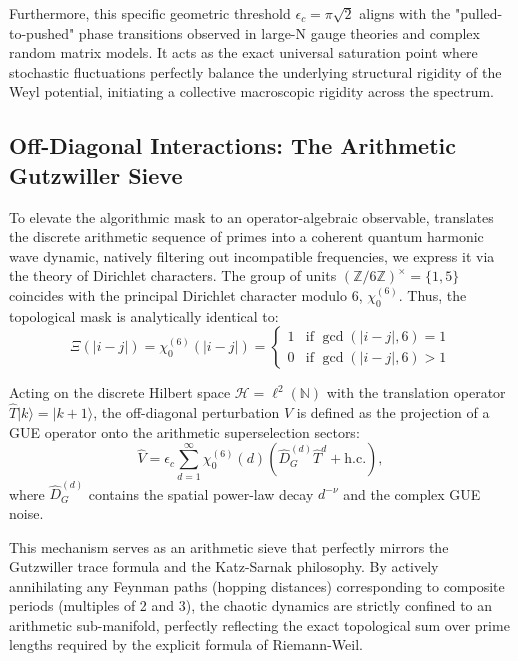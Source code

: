 \documentclass[aps,prl,preprint,superscriptaddress,floatfix]{revtex4-2}
\newcommand{\N}{\mathbb{N}}
\newcommand{\Hilb}{\mathcal{H}}
\newcommand{\Zmod}{\mathbb{Z}/6\mathbb{Z}}
\begin{document}
Furthermore, this specific geometric threshold $\epsilon_c = \pi\sqrt{2}$ aligns with the "pulled-to-pushed" phase transitions observed in large-N gauge theories and complex random matrix models\cite{Gross1980, Cunden2018}. It acts as the exact universal saturation point where stochastic fluctuations perfectly balance the underlying structural rigidity of the Weyl potential, initiating a collective macroscopic rigidity across the spectrum.

\subsection{Off-Diagonal Interactions: The Arithmetic Gutzwiller Sieve}

To elevate the algorithmic mask to an operator-algebraic observable, translates the discrete arithmetic sequence of primes into a coherent quantum harmonic wave dynamic, natively filtering out incompatible frequencies, we express it via the theory of Dirichlet characters. The group of units $(\Zmod)^\times = \{1, 5\}$ coincides with the principal Dirichlet character modulo 6, $\chi_0^{(6)}$. Thus, the topological mask is analytically identical to:
\begin{equation}
\Xi(|i-j|) = \chi_0^{(6)}(|i-j|) = \begin{cases} 
1 & \text{if } \gcd(|i-j|, 6) = 1 \\ 
0 & \text{if } \gcd(|i-j|, 6) > 1 
\end{cases}
\end{equation}

Acting on the discrete Hilbert space $\Hilb = \ell^2(\N)$ with the translation operator $\hat{T}|k\rangle = |k+1\rangle$, the off-diagonal perturbation $\hat{V}$ is defined as the projection of a GUE operator onto the arithmetic superselection sectors:
\begin{equation}
\label{eq:interaction}
\hat{V} = \epsilon_c \sum_{d=1}^{\infty} \chi_0^{(6)}(d) \left( \hat{D}_G^{(d)} \hat{T}^d + \text{h.c.} \right),
\end{equation}
where $\hat{D}_G^{(d)}$ contains the spatial power-law decay $d^{-\nu}$ and the complex GUE noise. 

This mechanism serves as an arithmetic sieve that perfectly mirrors the Gutzwiller trace formula and the Katz-Sarnak philosophy. By actively annihilating any Feynman paths (hopping distances) corresponding to composite periods (multiples of 2 and 3), the chaotic dynamics are strictly confined to an arithmetic sub-manifold, perfectly reflecting the exact topological sum over prime lengths required by the explicit formula of Riemann-Weil.
\end{document}
